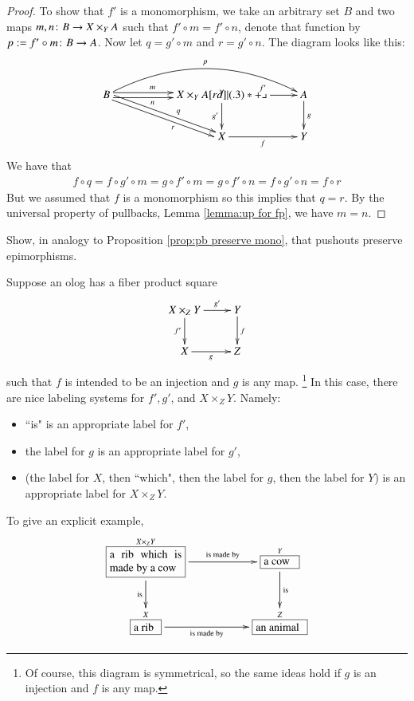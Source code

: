 \begin{proof}

To show that $f'$ is a monomorphism, we take an arbitrary set $B$ and two maps $m,n\colon B\rightarrow X\times_YA$ such that $f'\circ m=f'\circ n$, denote that function by $p:=f'\circ m\colon B\rightarrow A$. Now let $q=g'\circ m$ and $r=g'\circ n$. The diagram looks like this:
$$
\xymatrix{B\ar@<.5ex>[rr]^(.4)m\ar@<-.5ex>[rr]_(.4)n\ar@/^2pc/[rrr]^p\ar@<.5ex>[drr]^(.6)q\ar@<-.5ex>[drr]_(.6)r&&X\times_YA\ar[r]^{f'}\ar[d]_{g'}\ullimit&A\ar[d]^g\\&&X\ar[r]_f&Y}
$$
We have that 
\begin{align*}f\circ q=f\circ g'\circ m=g\circ f'\circ m=g\circ f'\circ n=f\circ g'\circ n=f\circ r\end{align*} 
But we assumed that $f$ is a monomorphism so this implies that $q=r$. By the universal property of pullbacks, Lemma \ref{lemma:up for fp}, we have $m=n$.

\end{proof}

\begin{exercise}
Show, in analogy to Proposition \ref{prop:pb preserve mono}, that pushouts preserve epimorphisms.
\end{exercise}

\begin{example}\label{exc:olog pullbacks}

Suppose an olog has a fiber product square
$$\xymatrix{X\times_ZY\ar[r]^-{g'}\ar[d]_{f'}&Y\ar[d]^f\\X\ar[r]_g&Z}$$ such that $f$ is intended to be an injection and $g$ is any map.
\footnote{Of course, this diagram is symmetrical, so the same ideas hold if $g$ is an injection and $f$ is any map.} 
In this case, there are nice labeling systems for $f', g'$, and $X\times_ZY$. Namely:
\begin{itemize}
\item ``is" is an appropriate label for $f'$, 
\item the label for $g$ is an appropriate label for $g'$,
\item (the label for $X$, then ``which", then the label for $g$, then the label for $Y$) is an appropriate label for $X\times_ZY$.
\end{itemize}

To give an explicit example, 
$$\xymatrix{
\obox{X\times_ZY}{.9in}{a rib which is made by a cow}\LA{rr}{is made by}\LAL{d}{is}&&\obox{Y}{.4in}{a cow}\LA{d}{is}\\
\obox{X}{.3in}{a rib}\LAL{rr}{is made by}&&\obox{Z}{.6in}{an animal}
}
$$

\end{example}

